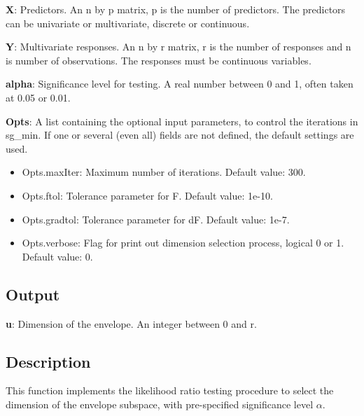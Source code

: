 \documentclass[a4paper,11pt,openany]{memoir}
\begin{document}
\begin{par}
\textbf{X}: Predictors. An n by p matrix, p is the number of predictors. The predictors can be univariate or multivariate, discrete or continuous.
\end{par} \vspace{1em}
\begin{par}
\textbf{Y}: Multivariate responses. An n by r matrix, r is the number of responses and n is number of observations. The responses must be continuous variables.
\end{par} \vspace{1em}
\begin{par}
\textbf{alpha}: Significance level for testing.  A real number between 0 and 1, often taken at 0.05 or 0.01.
\end{par} \vspace{1em}
\begin{par}
\textbf{Opts}: A list containing the optional input parameters, to control the iterations in sg\_min. If one or several (even all) fields are not defined, the default settings are used.
\end{par} \vspace{1em}
\begin{itemize}
\setlength{\itemsep}{-1ex}
   \item Opts.maxIter: Maximum number of iterations.  Default value: 300.
   \item Opts.ftol: Tolerance parameter for F.  Default value: 1e-10.
   \item Opts.gradtol: Tolerance parameter for dF.  Default value: 1e-7.
   \item Opts.verbose: Flag for print out dimension selection process, logical 0 or 1. Default value: 0.
\end{itemize}


\subsection*{Output}

\begin{par}
\textbf{u}: Dimension of the envelope. An integer between 0 and r.
\end{par} \vspace{1em}


\subsection*{Description}

\begin{par}
This function implements the likelihood ratio testing procedure to select the dimension of the envelope subspace, with pre-specified significance level $\alpha$.
\end{par} \vspace{1em}
\end{document}
